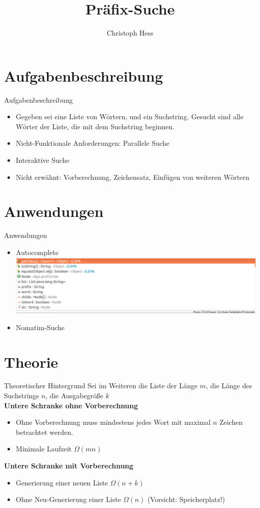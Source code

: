 \documentclass[11pt, xcolor=dvipsnames]{beamer}
\title{Präfix-Suche}
\author{Christoph Hess}
\begin{document}
	\maketitle
	
	\section{Aufgabenbeschreibung}
	\begin{frame}{Aufgabenbeschreibung}
		\begin{itemize}
			\item Gegeben sei eine Liste von Wörtern, und ein Suchstring. Gesucht sind alle Wörter der Liste, die mit dem Suchstring beginnen.
			
			\item Nicht-Funktionale Anforderungen: Parallele Suche
			\item Interaktive Suche
			\item Nicht erwähnt: Vorberechnung, Zeichensatz, Einfügen von weiteren Wörtern 
		\end{itemize}
	\end{frame}
	\section{Anwendungen}
	\begin{frame}{Anwendungen}
		\begin{itemize}
			\item Autocomplete
			\includegraphics[scale=0.3]{pics/autocomplete.png}
			\item Nomatim-Suche
			
		\end{itemize}
	\end{frame}
	\section{Theorie}
	\begin{frame}{Theoretischer Hintergrund}
	Sei im Weiteren die Liste der Länge $m$, die Länge des Suchstrings $n$, die Ausgabegröße $k$ \\ 
	
	
	\textbf{Untere Schranke ohne Vorberechnung}
		\begin{itemize}
			\item Ohne Vorberechnung muss mindestens jedes Wort mit maximal $n$ Zeichen betrachtet werden.
			\item Minimale Laufzeit $\Omega(mn)$
		\end{itemize}
		\textbf{Untere Schranke mit Vorberechnung}
		\begin{itemize}
			\item Generierung einer neuen Liste $\Omega(n+k)$ 
			\item Ohne Neu-Generierung einer Liste $\Omega(n)$ (Vorsicht: Speicherplatz!)	
		\end{itemize}
	\end{frame}
\end{document}
